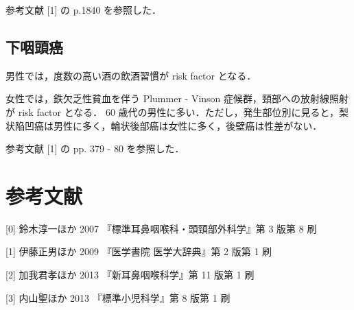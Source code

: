 \documentclass[10pt,uplatex]{jsarticle}
\begin{document}
参考文献 [1] の p.1840 を参照した．

\subsection{下咽頭癌}

男性では，度数の高い酒の飲酒習慣が risk factor となる．

女性では，鉄欠乏性貧血を伴う Plummer - Vinson 症候群，頸部への放射線照射が risk factor となる． 60 歳代の男性に多い．ただし，発生部位別に見ると，梨状陥凹癌は男性に多く，輪状後部癌は女性に多く，後壁癌は性差がない．

参考文献 [1] の pp. 379 - 80 を参照した．

\section*{参考文献}


[0] 鈴木淳一ほか 2007 『標準耳鼻咽喉科・頭頸部外科学』第 3 版第 8 刷

[1] 伊藤正男ほか 2009 『医学書院 医学大辞典』第 2 版第 1 刷

[2] 加我君孝ほか 2013 『新耳鼻咽喉科学』第 11 版第 1 刷

[3] 内山聖ほか 2013 『標準小児科学』第 8 版第 1 刷
\end{document}
